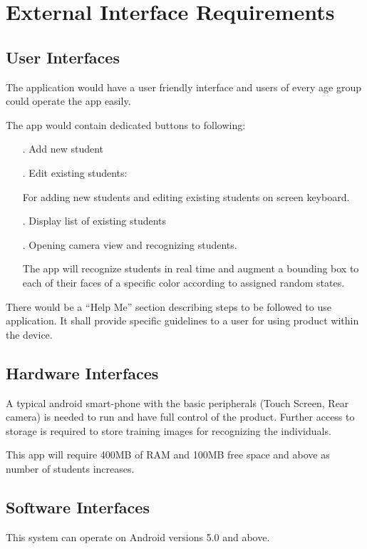 \newpage




\chapter{External Interface Requirements}
\label{External Interface Requirements}

\section{User Interfaces}
The application would have a user friendly interface and users of every age group could operate the app easily. 

The app would contain dedicated buttons to following:
\begin{itemize}
\item[.] Add new student
\item[.] Edit existing students:

\quad For adding new students and editing existing students on screen keyboard.

\item[.] Display list of existing students
\item[.] Opening camera view and recognizing students.

\quad The app will recognize students in real time and augment a bounding box to each of their faces of a specific color according to assigned random states.
\end{itemize}

There would be a “Help Me” section describing steps to be followed to use application. It shall provide specific guidelines to a user for using product within the device.

\section{Hardware Interfaces}
A typical android smart-phone with the basic peripherals (Touch Screen, Rear camera) is needed to run and have full control of the product. Further access to storage is required to store training images for recognizing the individuals.

This app will require 400MB of RAM and 100MB free space and above as number of students increases.

\section{Software Interfaces}
This system can operate on Android versions 5.0 and above.

